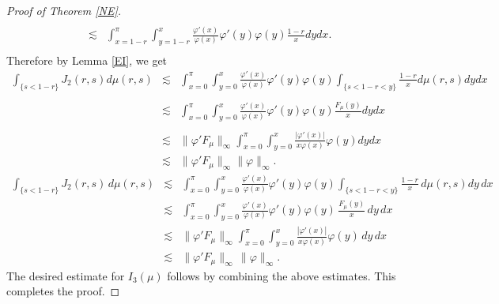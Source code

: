 \documentclass[12pt,reqno,a4paper]{amsart}
\numberwithin{equation}{section}
\begin{document}
\begin{proof}[Proof of Theorem \ref{NE}]
\[\begin{array}{lll}
			\\
			& \lesssim & \displaystyle \int _{x=1-r}^\pi  \displaystyle \int _{y=1-r}^x   \frac{\varphi'(x)}{\varphi(x)}\varphi'(y)\varphi(y)\frac{1-r}{x}dydx.\\
		\end{array}
		\]
		Therefore by Lemma \ref{EI}, we get
		\[
		\begin{array}{lll}
			\displaystyle \int_{\{s< 1-r\}}J_2(r,s) d\mu(r,s)& \lesssim &  \displaystyle \int _{x=0}^\pi  \displaystyle \int _{y=0}^x   \frac{\varphi'(x)}{\varphi(x)}\varphi'(y)\varphi(y)\displaystyle \int _{ {\{s< 1-r<y\}}}\frac{1-r}{x}d\mu(r,s)dydx\\
			\\
			& \lesssim &  \displaystyle\int_{x=0}^\pi  \int _{y=0}^x   \frac{\varphi'(x)}{\varphi(x)}\varphi'(y)\varphi(y) {\frac{F_\mu(y)}{x}}dydx\\
			\\
			& \lesssim & \|\varphi ' F_\mu\|_\infty \displaystyle \int _{x=0}^\pi  \displaystyle \int _{y=0}^x\frac{{\vert\varphi'(x)\vert}}{x\varphi(x)}\varphi(y)dydx\\
			& \lesssim &  \|\varphi ' F_\mu\|_\infty \| \varphi \|_\infty.
		\end{array}
		\]
		\[
		\begin{array}{lll}
			\displaystyle \int_{\{s<1-r\}} J_2(r,s)\, d\mu(r,s)
			& \lesssim &
			\displaystyle \int_{x=0}^{\pi} \int_{y=0}^{x}
			\frac{\varphi'(x)}{\varphi(x)} \varphi'(y)\varphi(y)
			\int_{{\{s<1-r<y\}}} \frac{1-r}{x}\, d\mu(r,s) dy\, dx \\[1.2em]
			& \lesssim &
			\displaystyle \int_{x=0}^{\pi} \int_{y=0}^{x}
			\frac{\varphi'(x)}{\varphi(x)} \varphi'(y)\varphi(y)\,
			{\frac{F_\mu(y)}{x}}\, dy\, dx \\[1.2em]
			& \lesssim &
			\|\varphi' F_\mu\|_\infty
			\displaystyle \int_{x=0}^{\pi} \int_{y=0}^{x}
			\frac{{|\varphi'(x)|}}{x\varphi(x)} \varphi(y)\, dy\, dx \\[1.2em]
			& \lesssim &
			\|\varphi' F_\mu\|_\infty \, \|\varphi\|_\infty.
		\end{array}
		\]
		The desired estimate for $I_3(\mu)$ follows by combining the above estimates. This completes the proof.
	\end{proof}
\end{document}
